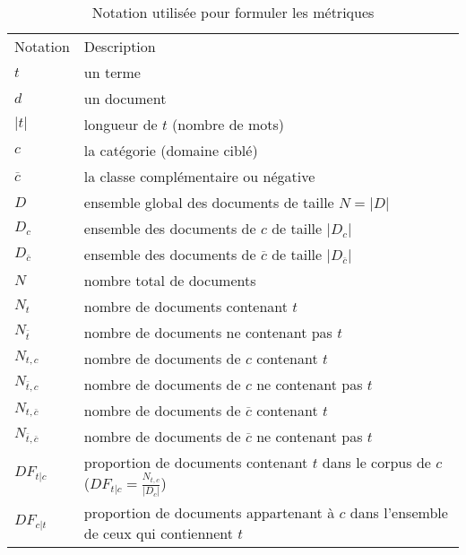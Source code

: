 \begin{table}[!htb]
	\centering
	\begin{tabular}{lp{}}
		\hline\noalign{\smallskip}
		Notation & Description \\
		\noalign{\smallskip}
		\hline
$t$ & un terme \\
$d$& un document \\
$\vert t \vert$ & longueur de $t$ (nombre de mots) \\
$c$ & la catégorie (domaine ciblé) \\
$\overline{c}$ & la classe complémentaire ou négative \\
$D$& ensemble global des documents de taille $N = \vert D \vert$ \\
$D_{c}$& ensemble des documents de $c$ de taille $\vert D_{c} \vert$ \\%
$D_{\overline{c}}$& ensemble des documents de $\overline{c}$ de taille $\vert D_{\overline{c}} \vert$\\%
$N$& nombre total de documents\\
$N_{t}$& nombre de documents contenant $t$\\
$N_{\overline{t}}$& nombre de documents ne contenant pas $t$\\
$N_{t,c}$ & nombre de documents de $c$ contenant $t$\\
$N_{\overline{t},c}$ & nombre de documents de $c$ ne contenant pas $t$\\%
$N_{t,\overline{c}}$ & nombre de documents de $\overline{c}$ contenant $t$\\%
$N_{\overline{t},\overline{c}}$ & nombre de documents de $\overline{c}$ ne contenant pas $t$\\%
$DF_{t \vert c}$ & proportion de documents contenant $t$ dans le corpus de $c$ ($DF_{t \vert c} = \frac{N_{t,c}}{\vert D_c \vert}$) \\
$DF_{c \vert t}$ & proportion de documents appartenant à $c$ dans l'ensemble de ceux qui contiennent $t$ \\
\hline
\end{tabular}
\caption{Notation utilisée pour formuler les métriques} \label{tab:quanta:notations_metriques}
\end{table}

